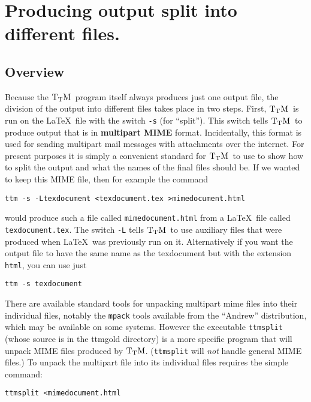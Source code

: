 \documentclass[12pt]{article}
\def\TtM{$\rm{}T_TH$}
\def\TtM{$\rm{}T_TM$}%
\begin{document}

\section{Producing output split into different files.}

\subsection{Overview}

Because the \TtM\ program itself always produces just one output file,
the division of the output into different files takes place in two
steps. First, \TtM\ is run on the \LaTeX\ file with the switch
\verb!-s! (for ``split''). This switch tells \TtM\ to produce output
that is in {\bf multipart MIME} format. Incidentally, this format is
used for sending multipart mail messages with attachments over the
internet. For present purposes it is simply a convenient standard for
\TtM\ to use to show how to split the output and what the names of the
final files should be. If we wanted to keep this MIME file, then for
example the command
\begin{verbatim}
ttm -s -Ltexdocument <texdocument.tex >mimedocument.html
\end{verbatim}

\noindent would produce such a file called \verb!mimedocument.html! from a
\LaTeX\ file called \verb!texdocument.tex!. The switch \verb!-L!
tells \TtM\ to use auxiliary files that were produced when \LaTeX\ 
was previously run on it. Alternatively if you want the output file to
have the same name as the texdocument but with the extension
\verb!html!, you can use just
\begin{verbatim}
ttm -s texdocument
\end{verbatim}

There are available standard tools for unpacking multipart mime files
into their individual files, notably the \verb!mpack! tools available from
the ``Andrew'' distribution, which may be available on some
systems. However the executable \verb!ttmsplit!  (whose source is in
the ttmgold directory) is a more specific 
program that will unpack MIME files produced by \TtM. (\verb!ttmsplit!
will {\em not} handle general MIME files.) To unpack the multipart
file into its individual files requires the simple command:

\begin{verbatim}
ttmsplit <mimedocument.html
\end{verbatim}
\end{document}
